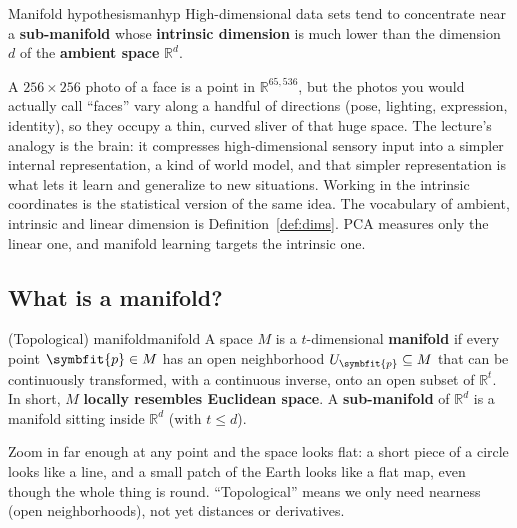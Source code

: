 \documentclass[11pt]{article}
\newcommand{\bm}[1]{\symbfit{#1}}
\newcommand{\R}{\mathbb{R}}
\begin{document}
\begin{definition}{Manifold hypothesis}{manhyp}
High-dimensional data sets tend to concentrate near a \textbf{sub-manifold} whose \textbf{intrinsic dimension} is much lower
than the dimension $d$ of the \textbf{ambient space} $\R^d$.
\end{definition}

\begin{intuition}
A $256\times256$ photo of a face is a point in $\R^{65{,}536}$, but the photos you would actually call ``faces'' vary along a handful
of directions (pose, lighting, expression, identity), so they occupy a thin, curved sliver of that huge space. The
lecture's analogy is the brain: it compresses high-dimensional sensory input into a simpler internal representation, a
kind of world model, and that simpler representation is what lets it learn and generalize to new situations. Working
in the intrinsic coordinates is the statistical version of the same idea. The vocabulary of ambient, intrinsic and linear
dimension is Definition~\ref{def:dims}. PCA measures only the linear one, and manifold learning targets the intrinsic one.
\end{intuition}

\subsection{What is a manifold?}

\begin{definition}{(Topological) manifold}{manifold}
A space $M$ is a $t$-dimensional \textbf{manifold} if every point $\bm p\in M$ has an open neighborhood $U_{\bm p}\subseteq M$ that can be
continuously transformed, with a continuous inverse, onto an open subset of $\R^t$. In short, $M$ \textbf{locally resembles
Euclidean space}. A \textbf{sub-manifold} of $\R^d$ is a manifold sitting inside $\R^d$ (with $t\le d$).
\end{definition}

\begin{intuition}
Zoom in far enough at any point and the space looks flat: a short piece of a circle looks like a line, and a small
patch of the Earth looks like a flat map, even though the whole thing is round. ``Topological'' means we only need
nearness (open neighborhoods), not yet distances or derivatives.
\end{intuition}
\end{document}

